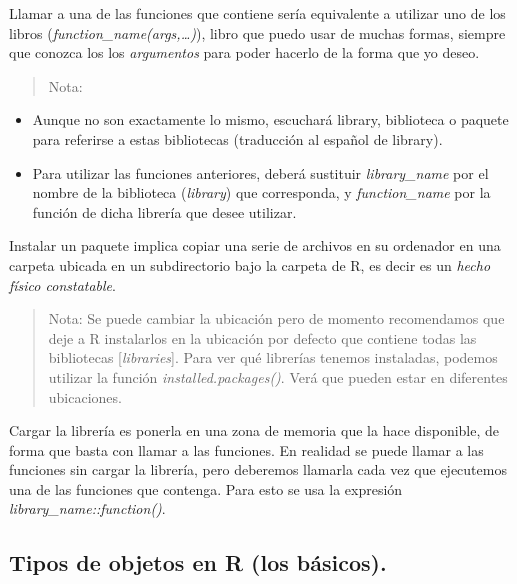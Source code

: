 \documentclass[
  letterpaper,
  DIV=11,
  numbers=noendperiod]{scrreprt}
\providecommand{\tightlist}{%
  \setlength{\itemsep}{0pt}\setlength{\parskip}{0pt}}\usepackage{longtable,booktabs,array}
\begin{document}
Llamar a una de las funciones que contiene sería equivalente a utilizar
uno de los libros (\emph{function\_name(args,\ldots)}), libro que puedo
usar de muchas formas, siempre que conozca los los \emph{argumentos}
para poder hacerlo de la forma que yo deseo.

\begin{quote}
Nota:
\end{quote}

\begin{itemize}
\tightlist
\item
  Aunque no son exactamente lo mismo, escuchará library, biblioteca o
  paquete para referirse a estas bibliotecas (traducción al español de
  library).
\item
  Para utilizar las funciones anteriores, deberá sustituir
  \emph{library\_name} por el nombre de la biblioteca (\emph{library})
  que corresponda, y \emph{function\_name} por la función de dicha
  librería que desee utilizar.
\end{itemize}

Instalar un paquete implica copiar una serie de archivos en su ordenador
en una carpeta ubicada en un subdirectorio bajo la carpeta de R, es
decir es un \emph{hecho físico constatable}.

\begin{quote}
Nota: Se puede cambiar la ubicación pero de momento recomendamos que
deje a R instalarlos en la ubicación por defecto que contiene todas las
bibliotecas {[}\emph{libraries}{]}. Para ver qué librerías tenemos
instaladas, podemos utilizar la función \emph{installed.packages()}.
Verá que pueden estar en diferentes ubicaciones.
\end{quote}

Cargar la librería es ponerla en una zona de memoria que la hace
disponible, de forma que basta con llamar a las funciones. En realidad
se puede llamar a las funciones sin cargar la librería, pero deberemos
llamarla cada vez que ejecutemos una de las funciones que contenga. Para
esto se usa la expresión \emph{library\_name::function()}.

\hypertarget{tipos-de-objetos-en-r-los-buxe1sicos.}{%
\subsection{Tipos de objetos en R (los
básicos).}\label{tipos-de-objetos-en-r-los-buxe1sicos.}}
\end{document}
